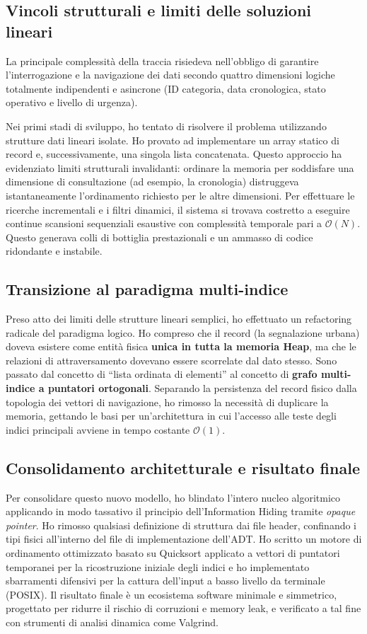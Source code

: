 \documentclass[12pt, a4paper]{article}
\begin{document}
\subsection{Vincoli strutturali e limiti delle soluzioni lineari}
La principale complessità della traccia risiedeva nell'obbligo di garantire l'interrogazione e la navigazione dei dati secondo quattro dimensioni logiche totalmente indipendenti e asincrone (ID categoria, data cronologica, stato operativo e livello di urgenza).

Nei primi stadi di sviluppo, ho tentato di risolvere il problema utilizzando strutture dati lineari isolate. Ho provato ad implementare un array statico di record e, successivamente, una singola lista concatenata. Questo approccio ha evidenziato limiti strutturali invalidanti: ordinare la memoria per soddisfare una dimensione di consultazione (ad esempio, la cronologia) distruggeva istantaneamente l'ordinamento richiesto per le altre dimensioni. Per effettuare le ricerche incrementali e i filtri dinamici, il sistema si trovava costretto a eseguire continue scansioni sequenziali esaustive con complessità temporale pari a $\mathcal{O}(N)$. Questo generava colli di bottiglia prestazionali e un ammasso di codice ridondante e instabile.

\subsection{Transizione al paradigma multi-indice}
Preso atto dei limiti delle strutture lineari semplici, ho effettuato un refactoring radicale del paradigma logico. Ho compreso che il record (la segnalazione urbana) doveva esistere come entità fisica \textbf{unica in tutta la memoria Heap}, ma che le relazioni di attraversamento dovevano essere scorrelate dal dato stesso. Sono passato dal concetto di ``lista ordinata di elementi'' al concetto di \textbf{grafo multi-indice a puntatori ortogonali}. Separando la persistenza del record fisico dalla topologia dei vettori di navigazione, ho rimosso la necessità di duplicare la memoria, gettando le basi per un'architettura in cui l'accesso alle teste degli indici principali avviene in tempo costante $\mathcal{O}(1)$.

\subsection{Consolidamento architetturale e risultato finale}
Per consolidare questo nuovo modello, ho blindato l'intero nucleo algoritmico applicando in modo tassativo il principio dell'Information Hiding tramite \textit{opaque pointer}. Ho rimosso qualsiasi definizione di struttura dai file header, confinando i tipi fisici all'interno del file di implementazione dell'ADT. Ho scritto un motore di ordinamento ottimizzato basato su Quicksort applicato a vettori di puntatori temporanei per la ricostruzione iniziale degli indici e ho implementato sbarramenti difensivi per la cattura dell'input a basso livello da terminale (POSIX). Il risultato finale è un ecosistema software minimale e simmetrico, progettato per ridurre il rischio di corruzioni e memory leak, e verificato a tal fine con strumenti di analisi dinamica come Valgrind.
\end{document}
